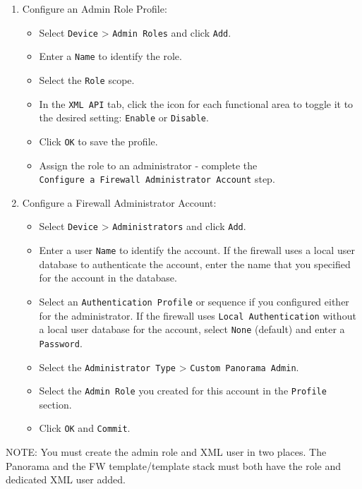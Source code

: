 \begin{enumerate}
\def\labelenumi{\arabic{enumi}.}
\item
  Configure an Admin Role Profile:

  \begin{itemize}
  \tightlist
  \item
    Select \texttt{Device} \textgreater{} \texttt{Admin\ Roles} and
    click \texttt{Add}.
  \item
    Enter a \texttt{Name} to identify the role.
  \item
    Select the \texttt{Role} scope.
  \item
    In the \texttt{XML\ API} tab, click the icon for each functional
    area to toggle it to the desired setting: \texttt{Enable} or
    \texttt{Disable}.
  \item
    Click \texttt{OK} to save the profile.
  \item
    Assign the role to an administrator - complete the
    \texttt{Configure\ a\ Firewall\ Administrator\ Account} step.
  \end{itemize}
\item
  Configure a Firewall Administrator Account:

  \begin{itemize}
  \tightlist
  \item
    Select \texttt{Device} \textgreater{} \texttt{Administrators} and
    click \texttt{Add}.
  \item
    Enter a user \texttt{Name} to identify the account. If the firewall
    uses a local user database to authenticate the account, enter the
    name that you specified for the account in the database.
  \item
    Select an \texttt{Authentication\ Profile} or sequence if you
    configured either for the administrator. If the firewall uses
    \texttt{Local\ Authentication} without a local user database for the
    account, select \texttt{None} (default) and enter a
    \texttt{Password}.
  \item
    Select the \texttt{Administrator\ Type} \textgreater{}
    \texttt{Custom\ Panorama\ Admin}.
  \item
    Select the \texttt{Admin\ Role} you created for this account in the
    \texttt{Profile} section.
  \item
    Click \texttt{OK} and \texttt{Commit}.
  \end{itemize}
\end{enumerate}

NOTE: You must create the admin role and XML user in two places. The
Panorama and the FW template/template stack must both have the role and
dedicated XML user added.

